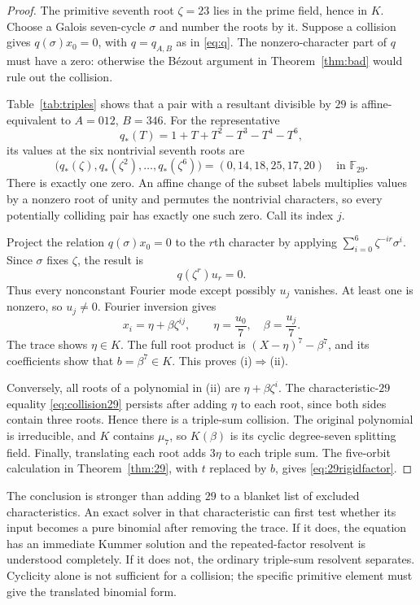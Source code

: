 \documentclass[11pt,a4paper]{article}
\theoremstyle{definition}
\theoremstyle{remark}
\newcommand{\F}{\mathbb F}
\begin{document}
\begin{proof}
The primitive seventh root $\zeta=23$ lies in the prime field, hence in
$K$. Choose a Galois seven-cycle $\sigma$ and number the roots by it.
Suppose a collision gives $q(\sigma)x_0=0$, with
$q=q_{A,B}$ as in \eqref{eq:q}. The nonzero-character part of $q$ must
have a zero: otherwise the B\'ezout argument in
Theorem~\ref{thm:bad} would rule out the collision.

Table~\ref{tab:triples} shows that a pair with a resultant divisible by
$29$ is affine-equivalent to $A=012$, $B=346$. For the representative
\[
 q_*(T)=1+T+T^2-T^3-T^4-T^6,
\]
its values at the six nontrivial seventh roots are
\[
 \bigl(q_*(\zeta),q_*(\zeta^2),\ldots,q_*(\zeta^6)\bigr)
   =(0,14,18,25,17,20)\quad\text{in }\F_{29}.
\]
There is exactly one zero. An affine change of the subset labels
multiplies values by a nonzero root of unity and permutes the nontrivial
characters, so every potentially colliding pair has exactly one such zero.
Call its index $j$.

Project the relation $q(\sigma)x_0=0$ to the $r$th character by applying
$\sum_{i=0}^6\zeta^{-ir}\sigma^i$. Since $\sigma$ fixes $\zeta$, the
result is
\[
 q(\zeta^r)u_r=0.
\]
Thus every nonconstant Fourier mode except possibly $u_j$ vanishes.
At least one is nonzero, so $u_j\neq0$. Fourier inversion gives
\[
 x_i=\eta+\beta\zeta^{ij},\qquad
 \eta=\frac{u_0}{7},\quad\beta=\frac{u_j}{7}.
\]
The trace shows $\eta\in K$. The full root product is
$(X-\eta)^7-\beta^7$, and its coefficients show that
$b=\beta^7\in K$. This proves (i)$\Rightarrow$(ii).

Conversely, all roots of a polynomial in (ii) are
$\eta+\beta\zeta^i$. The characteristic-$29$ equality
\eqref{eq:collision29} persists after adding $\eta$ to each root, since
both sides contain three roots. Hence there is a triple-sum collision.
The original polynomial is irreducible, and $K$ contains $\mu_7$, so
$K(\beta)$ is its cyclic degree-seven splitting field. Finally, translating
each root adds $3\eta$ to each triple sum. The five-orbit calculation in
Theorem~\ref{thm:29}, with $t$ replaced by $b$, gives
\eqref{eq:29rigidfactor}.
\end{proof}

The conclusion is stronger than adding $29$ to a blanket list of excluded
characteristics. An exact solver in that characteristic can first test
whether its input becomes a pure binomial after removing the trace. If it
does, the equation has an immediate Kummer solution and the repeated-factor
resolvent is understood completely. If it does not, the ordinary triple-sum
resolvent separates. Cyclicity alone is not sufficient for a collision;
the specific primitive element must give the translated binomial form.
\end{document}
